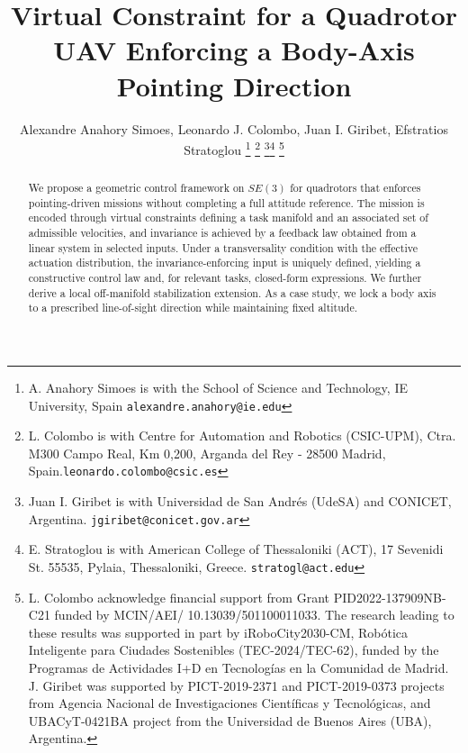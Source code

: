 \documentclass[letterpaper, 10 pt, conference]{ieeeconf}
\begin{document}
\title{Virtual Constraint for a Quadrotor UAV Enforcing a Body-Axis Pointing Direction}


\author{Alexandre Anahory Simoes,  Leonardo J. Colombo, Juan I. Giribet, Efstratios Stratoglou%
\thanks{A. Anahory Simoes is with the School of Science and Technology, IE University, Spain
        {\tt\small alexandre.anahory@ie.edu}}
\thanks{L. Colombo is with Centre for Automation and Robotics (CSIC-UPM), Ctra. M300 Campo Real, Km 0,200, Arganda
del Rey - 28500 Madrid, Spain.{\tt\small leonardo.colombo@csic.es}}%
\thanks{Juan I. Giribet is with Universidad de San Andr\'es (UdeSA) and CONICET, Argentina.
        {\tt\small jgiribet@conicet.gov.ar}}\thanks{E. Stratoglou is with American College of Thessaloniki (ACT), 17 Sevenidi St.
55535, Pylaia, Thessaloniki, Greece. {\tt\small stratogl@act.edu}}
\thanks{L. Colombo acknowledge financial support from Grant PID2022-137909NB-C21 funded by MCIN/AEI/ 10.13039/501100011033. The research leading to these results was supported in part by iRoboCity2030-CM, Robótica Inteligente para Ciudades Sostenibles (TEC-2024/TEC-62), funded by the Programas de Actividades I+D en Tecnologías en la Comunidad de Madrid. J. Giribet was supported by PICT-2019-2371 and PICT-2019-0373 projects from Agencia Nacional de Investigaciones Cient\'ificas y Tecnol\'ogicas, and UBACyT-0421BA project from the Universidad de Buenos Aires (UBA), Argentina.}%
%
}


\maketitle
\begin{abstract}
We propose a geometric control framework on $SE(3)$ for quadrotors that enforces pointing-driven missions without completing a full attitude reference. The mission is encoded through virtual constraints defining a task manifold and an associated set of admissible velocities, and invariance is achieved by a feedback law obtained from a linear system in selected inputs. Under a transversality condition with the effective actuation distribution, the invariance-enforcing input is uniquely defined, yielding a constructive control law and, for relevant tasks, closed-form expressions. We further derive a local off-manifold stabilization extension. As a case study, we lock a body axis to a prescribed line-of-sight direction while maintaining fixed altitude.%
\end{abstract}
\end{document}
